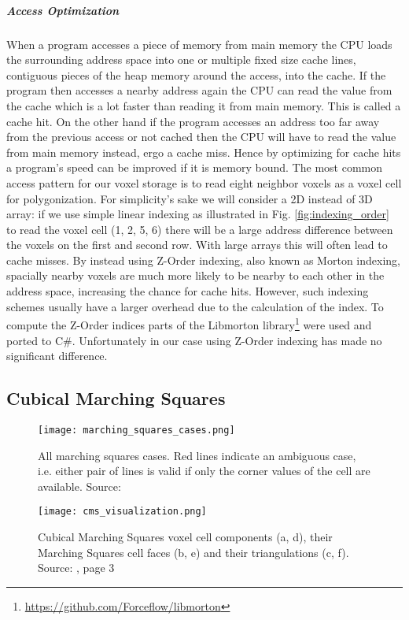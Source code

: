 \subparagraph{Access Optimization}

When a program accesses a piece of memory from main memory the CPU loads the surrounding address space into one or multiple fixed size cache lines, contiguous pieces of the heap memory around the access, into the cache.
If the program then accesses a nearby address again the CPU can read the value from the cache which is a lot faster than reading it from main memory. This is called a cache hit. On the other hand if the program accesses an address too far away from the previous access or not cached then the CPU will have to read the value from main memory instead, ergo a cache miss. Hence by optimizing for cache hits a program's speed can be improved if it is memory bound. The most
common access pattern for our voxel storage is to read eight neighbor voxels as a voxel cell for polygonization.
For simplicity's sake we will consider a 2D instead of 3D array: if we use simple linear indexing as illustrated in Fig. \ref{fig:indexing_order} to read the voxel cell (1, 2, 5, 6) there will be a large address difference between the voxels
on the first and second row. With large arrays this will often lead to cache misses. By instead using Z-Order indexing, also known as Morton indexing, spacially nearby voxels are much more likely to be nearby to each other in the address space, increasing the chance for cache hits. However, such indexing schemes usually have a larger overhead due to the calculation of the index. To compute the Z-Order indices parts of the Libmorton library\footnote{\url{https://github.com/Forceflow/libmorton}} were used and ported to C\#. Unfortunately in our case using Z-Order indexing has made no significant difference.


\subsection{Cubical Marching Squares}
\label{sec:cms}

\hfill

\begin{figure}[!htb]
\vspace*{10mm}
\texttt{[image: marching\_squares\_cases.png]}
\vspace*{10mm}
\caption{All marching squares cases. Red lines indicate an ambiguous case,
i.e. either pair of lines is valid if only the corner values of the cell
are available. Source: \cite{marching_squares}}
\label{fig:marching_squares_cases}
\endminipage\hfill
{}
\texttt{[image: cms\_visualization.png]}
\caption{Cubical Marching Squares voxel cell components (a, d), their Marching Squares cell faces (b, e) and their triangulations (c, f). Source: \cite{cubical_marching_squares}, page 3}
\label{fig:cms_visualization}
\endminipage\hfill
\end{figure}


